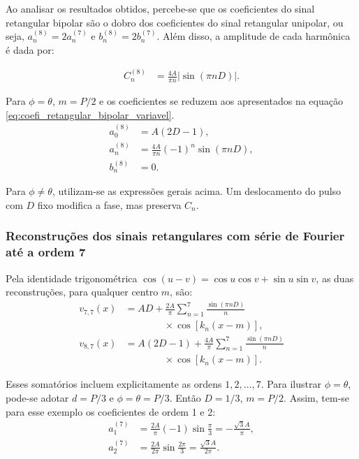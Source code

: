 Ao analisar os resultados obtidos, percebe-se que os coeficientes do sinal retangular bipolar são o dobro dos coeficientes do sinal retangular unipolar, ou seja, $a_n^{(8)}=2a_n^{(7)}$ e $b_n^{(8)}=2b_n^{(7)}$.
Além disso, a amplitude de cada harmônica é dada por:

\begin{equation}
    \begin{aligned}
        C_n^{(8)}&=\frac{4A}{\pi n}\lvert\sin(\pi nD)\rvert.
    \end{aligned}
\end{equation}

Para $\phi=\theta$, $m=P/2$ e os coeficientes se reduzem aos apresentados na equação \ref{eq:coefi_retangular_bipolar_variavel}.
\begin{equation}
    \begin{aligned}
        a_0^{(8)}&=A(2D-1), \\
        a_n^{(8)}&=\frac{4A}{\pi n}(-1)^n\sin(\pi nD), \\
        b_n^{(8)}&=0.
    \end{aligned}
    \label{eq:coefi_retangular_bipolar_variavel}
\end{equation}

Para $\phi\neq\theta$, utilizam-se as expressões gerais acima.
Um deslocamento do pulso com $D$ fixo modifica a fase, mas preserva $C_n$.

\subsubsection{Reconstruções dos sinais retangulares com série de Fourier até a ordem 7}

Pela identidade trigonométrica $\cos(u-v)=\cos u\cos v+\sin u\sin v$,
as duas reconstruções, para qualquer centro $m$, são:
\begin{equation}
    \begin{aligned}
        v_{7,7}(x)&=AD+\frac{2A}{\pi}\sum_{n=1}^{7}
            \frac{\sin(\pi nD)}{n} \\
            &\qquad\qquad {}\times\cos[k_n(x-m)], \\
        v_{8,7}(x)&=A(2D-1)+\frac{4A}{\pi}\sum_{n=1}^{7}
            \frac{\sin(\pi nD)}{n} \\
            &\qquad\qquad {}\times\cos[k_n(x-m)].
    \end{aligned}
    \label{eq:retangulares_7}
\end{equation}

Esses somatórios incluem explicitamente as ordens $1,2,\ldots,7$.
Para ilustrar $\phi=\theta$, pode-se adotar $d=P/3$ e $\phi=\theta=P/3$.
Então $D=1/3$, $m=P/2$. Assim, tem-se para esse exemplo os coeficientes de ordem 1 e 2:
\begin{equation}
    \begin{aligned}
        a_1^{(7)}&=\frac{2A}{\pi}(-1)\sin\frac{\pi}{3}
            =-\frac{\sqrt{3}A}{\pi}, \\
        a_2^{(7)}&=\frac{2A}{2\pi}\sin\frac{2\pi}{3}
            =\frac{\sqrt{3}A}{2\pi}.
    \end{aligned}
\end{equation}

